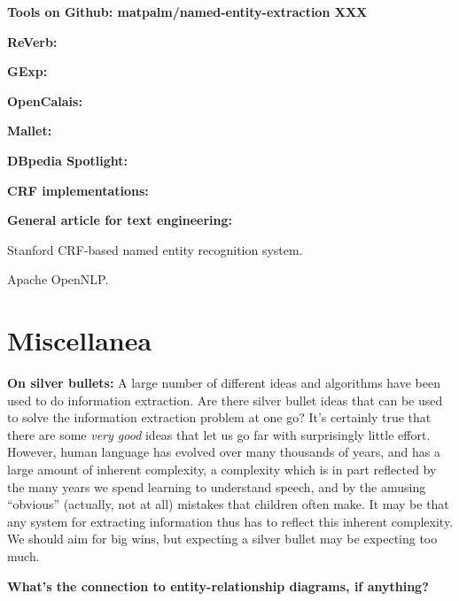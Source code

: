 \textbf{Tools on Github: matpalm/named-entity-extraction XXX}

\textbf{ReVerb:}

\textbf{GExp:}

\textbf{OpenCalais:}

\textbf{Mallet:}

\textbf{DBpedia Spotlight:}

\textbf{CRF implementations:}

\textbf{General article for text engineering:}

Stanford CRF-based named entity recognition system.

Apache OpenNLP.

\section{Miscellanea}

\textbf{On silver bullets:} A large number of different ideas and
algorithms have been used to do information extraction.  Are there
silver bullet ideas that can be used to solve the information
extraction problem at one go?  It's certainly true that there are some
\emph{very good} ideas that let us go far with surprisingly little
effort.  However, human language has evolved over many thousands of
years, and has a large amount of inherent complexity, a complexity
which is in part reflected by the many years we spend learning to
understand speech, and by the amusing ``obvious'' (actually, not at
all) mistakes that children often make.  It may be that any system for
extracting information thus has to reflect this inherent complexity.
We should aim for big wins, but expecting a silver bullet may be
expecting too much.

\textbf{What's the connection to entity-relationship diagrams, if
  anything?}

